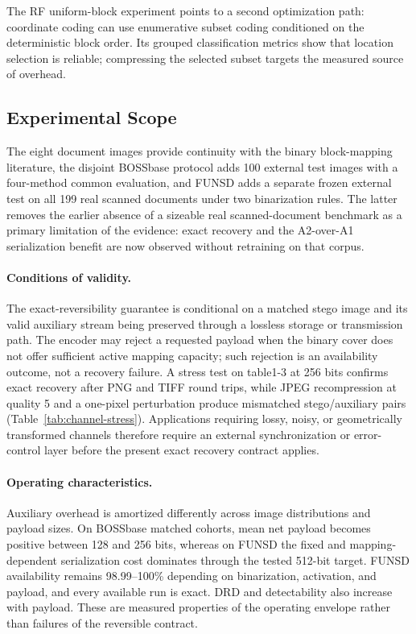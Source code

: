 \documentclass[a4paper,fleqn]{cas-dc}
\newcommand{\RevisionAddBegin}{\begingroup}
\newcommand{\RevisionAddEnd}{\endgroup}
\newcommand{\RevisionAddBegin}{\begingroup\color{revisionblue}}
\newcommand{\RevisionAddEnd}{\endgroup}
\begin{document}
\RevisionAddBegin
The RF uniform-block experiment points to a second optimization path:
\RevisionAddEnd
coordinate coding can use enumerative subset coding conditioned on the
deterministic block order. Its grouped classification metrics show that
location selection is reliable; compressing the selected subset targets the
measured source of overhead.

\subsection{Experimental Scope}
\label{subsec:scope}

\RevisionAddBegin
The eight document images provide continuity with the binary block-mapping
literature, the disjoint BOSSbase protocol adds 100 external test images with a
four-method common evaluation, and FUNSD adds a separate frozen external test
on all 199 real scanned documents under two binarization rules. The latter
removes the earlier absence of a sizeable real scanned-document benchmark as a
primary limitation of the evidence: exact recovery and the A2-over-A1
serialization benefit are now observed without retraining on that corpus.

\paragraph{Conditions of validity.}
The exact-reversibility guarantee is conditional on a matched stego image and
its valid auxiliary stream being preserved through a lossless storage or
transmission path. The encoder may reject a requested payload when the binary
cover does not offer sufficient active mapping capacity; such rejection is an
availability outcome, not a recovery failure. A stress test on table1-3 at 256
bits confirms exact recovery after PNG and TIFF round trips, while JPEG
recompression at quality 5 and a one-pixel perturbation produce mismatched
stego/auxiliary pairs (Table~\ref{tab:channel-stress}). Applications requiring
lossy, noisy, or geometrically transformed channels therefore require an
external synchronization or error-control layer before the present exact
recovery contract applies.

\paragraph{Operating characteristics.}
Auxiliary overhead is amortized differently across image distributions and
payload sizes. On BOSSbase matched cohorts, mean net payload becomes positive
between 128 and 256 bits, whereas on FUNSD the fixed and mapping-dependent
serialization cost dominates through the tested 512-bit target. FUNSD
availability remains 98.99--100\% depending on binarization, activation, and
payload, and every available run is exact. DRD and detectability also increase
with payload. These are measured properties of the operating envelope rather
than failures of the reversible contract.
\end{document}

